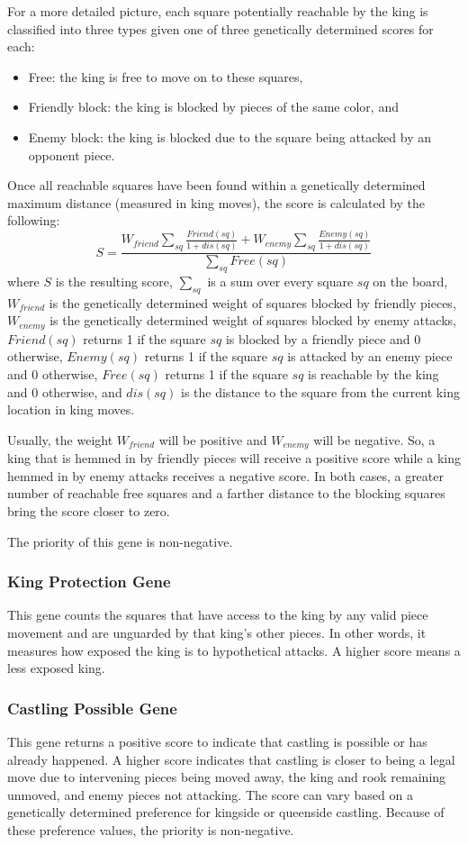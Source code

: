 \documentclass[letterpaper]{article}
\renewcommand{\_}{\allowbreak\textunderscore\allowbreak}
\begin{document}
For a more detailed picture, each square potentially reachable by the king is classified into three types given one of three genetically determined scores for each:
\begin{itemize}
	\item Free: the king is free to move on to these squares,
	\item Friendly block: the king is blocked by pieces of the same color, and
	\item Enemy block: the king is blocked due to the square being attacked by an opponent piece.
\end{itemize}
Once all reachable squares have been found within a genetically determined maximum distance (measured in king moves), the score is calculated by the following:
\[S = \frac{W_{friend}\sum_{sq}\frac{Friend(sq)}{1+dis(sq)} + W_{enemy}\sum_{sq}\frac{Enemy(sq)}{1+dis(sq)}}{\sum_{sq}Free(sq)}
\]
where \(S\) is the resulting score, \(\sum_{sq}\) is a sum over every square \(sq\) on the board, \(W_{friend}\) is the genetically determined weight of squares blocked by friendly pieces, \(W_{enemy}\) is the genetically determined weight of squares blocked by enemy attacks, \(Friend(sq)\) returns 1 if the square \(sq\) is blocked by a friendly piece and 0 otherwise, \(Enemy(sq)\) returns 1 if the square \(sq\) is attacked by an enemy piece and 0 otherwise, \(Free(sq)\) returns 1 if the square \(sq\) is reachable by the king and 0 otherwise, and \(dis(sq)\) is the distance to the square from the current king location in king moves.

Usually, the weight \(W_{friend}\) will be positive and \(W_{enemy}\) will be negative. So, a king that is hemmed in by friendly pieces will receive a positive score while a king hemmed in by enemy attacks receives a negative score. In both cases, a greater number of reachable free squares and a farther distance to the blocking squares bring the score closer to zero.

The priority of this gene is non-negative.

\subsubsection{King Protection Gene}
This gene counts the squares that have access to the king by any valid piece movement and are unguarded by that king's other pieces. In other words, it measures how exposed the king is to hypothetical attacks. A higher score means a less exposed king.

\subsubsection{Castling Possible Gene}
This gene returns a positive score to indicate that castling is possible or has already happened. A higher score indicates that castling is closer to being a legal move due to intervening pieces being moved away, the king and rook remaining unmoved, and enemy pieces not attacking. The score can vary based on a genetically determined preference for kingside or queenside castling. Because of these preference values, the priority is non-negative.
\end{document}
